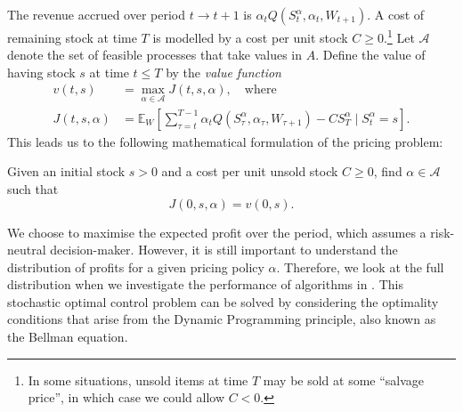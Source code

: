\documentclass[main.tex]{subfiles}
\begin{document}
The revenue accrued over period $t\to t+1$ is $\alpha_tQ(S_t^\alpha,\alpha_t,W_{t+1})$.
A cost of remaining stock at time $T$ is modelled by a cost per unit
stock $C\geq 0$.\footnote{In some situations, unsold items at time $T$
  may be sold at some ``salvage price'', in which case we could allow
  $C<0$.}
Let $\mathcal A$ denote the set of feasible processes that take values
in $A$.
Define the value of having stock $s$ at time $t\leq T$
by the \emph{value function}
\begin{align}\label{eq:value_function_def}
  v(t,s)&=\max_{\alpha\in\mathcal A} J(t,s,\alpha),\quad\text{where}\\
  J(t,s,\alpha)&=
                 \mathbb E_{W}\left[ \sum_{\tau=t}^{T-1}
                 \alpha_tQ(S_\tau^\alpha,\alpha_\tau,W_{\tau+1})
                 - CS_T^\alpha \mid S_t^\alpha = s
                 \right].
                 \label{eq:value_function_def2}
\end{align}
This leads us to the following mathematical formulation of the pricing
problem:
\begin{mydef}
  Given an initial stock $s>0$ and a cost per unit unsold stock $C\geq
  0$, find $\alpha\in\mathcal A$ such that
  \begin{equation}
    J(0,s,\alpha) = v(0,s).
  \end{equation}
\end{mydef}
We choose to maximise the expected profit over the period, which
assumes a risk-neutral decision-maker. However, it is still important
to understand the distribution of profits for a given pricing policy
$\alpha$. Therefore, we look at the full distribution when
we investigate the performance of algorithms in
.
This stochastic optimal control problem can be solved by
considering the optimality conditions that arise from the Dynamic
Programming principle, also known as the Bellman equation.
\end{document}
